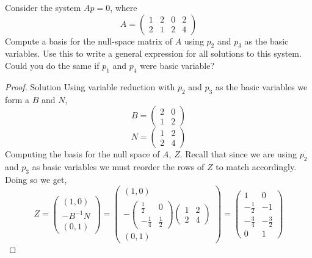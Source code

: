 \documentclass[12pt]{article}
\makeatletter
\theoremstyle{homework}
\newenvironment{exercise}[1]
{\def\@currentlabel{#1}\exercisecore}
{\endexercisecore}
\makeatother
\begin{document}
\begin{exercise}{3.3} Consider the system $Ap = 0$, where
  \begin{equation*}
    A = \begin{pmatrix}
      1& 2& 0& 2\\
      2& 1& 2& 4
    \end{pmatrix}
  \end{equation*}
  Compute a basis for the null-space matrix of $A$ using $p_2$ and $p_3$
  as the basic variables. Use this to write a general expression for all solutions to this system. 
  Could you do the same if $p_1$ and $p_4$ were basic variable?
  \begin{proof}{Solution} Using variable reduction with  $p_2$ and $p_3$
    as the basic variables we form a $B$ and $N$, 
    \begin{equation*}
      B = \begin{pmatrix}
        2 & 0 \\
        1 & 2
      \end{pmatrix}
    \end{equation*}
    \begin{equation*}
      N = \begin{pmatrix}
        1& 2 \\
        2& 4 
      \end{pmatrix}
    \end{equation*}
    Computing the basis for the null space of $A$, $Z$. Recall that since we are using $p_2$ and $p_3$ as 
    basic variables we must reorder the rows of $Z$ to match accordingly. Doing so we get, 
    \begin{equation*}
      Z =  
      \begin{pmatrix}
        (1, 0)\\
        -B^{-1}N\\
        (0,1)
      \end{pmatrix}= 
      \begin{pmatrix}
        (1, 0)\\
        -\begin{pmatrix}\frac{1}{2}&0\\ -\frac{1}{4}&\frac{1}{2}\end{pmatrix}\begin{pmatrix}1&2\\ 2&4\end{pmatrix}\\
        (0,1)
      \end{pmatrix} =
      \begin{pmatrix}1& 0\\ -\frac{1}{2}&-1\\ -\frac{3}{4}&-\frac{3}{2}\\ 0 & 1\end{pmatrix}

\end{equation*}
\end{proof}
\end{exercise}
\end{document}
